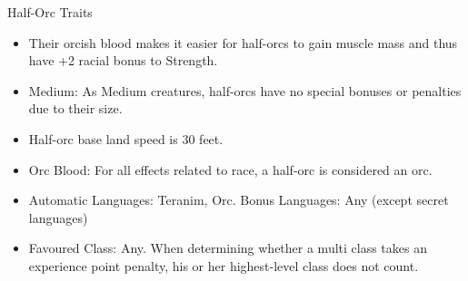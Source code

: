 \begin{35e}{Half-Orc Traits}
  \begin{itemize}[noitemsep]
    \item Their orcish blood makes it easier for half-orcs to gain muscle mass
      and thus have +2 racial bonus to Strength.
    \item Medium: As Medium creatures, half-orcs have no special bonuses or
      penalties due to their size.
    \item Half-orc base land speed is 30 feet.
    \item Orc Blood: For all effects related to race, a half-orc is considered
    an orc.
    \item Automatic Languages: Teranim, Orc. Bonus Languages: Any (except secret
      languages)
    \item Favoured Class: Any. When determining whether a multi class takes an
    experience point penalty, his or her highest-level class does not count.
  \end{itemize}
\end{35e}
